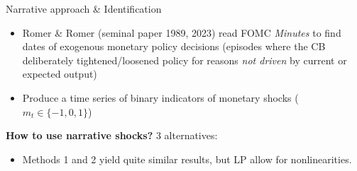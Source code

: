 \documentclass{beamer}
\begin{document}
\begin{frame}{Narrative approach \& Identification}
\small

\begin{itemize}
\item Romer \& Romer (seminal paper 1989, 2023) read FOMC \textit{Minutes} to find dates of exogenous monetary policy decisions (episodes where the CB deliberately tightened/loosened policy for reasons \emph{not driven} by current or expected output)
\item Produce a time series of binary indicators of monetary shocks ($m_t \in \{-1,0,1\}$)
\end{itemize}

\textbf{How to use narrative shocks?} 3 alternatives:
\begin{itemize}
  \begin{enumerate}
  \item \textbf{Include it as an exogenous regressor (VARX) or as the shock in a
        Structural VAR block where the narrative equation is purely exogenous.}
  \item Use \textbf{Local Projection }(\textit{cf. next class}) equation of interest with narrative shock as structural shock and compute IRFs (Jordà, 2015).
  \item If the measurement is noisy: \textbf{use it as an instrument (Proxy-VAR}, cf. \textit{next class})
  \end{enumerate}
\item Methods 1 and 2 yield quite similar results, but LP allow for nonlinearities.
\end{itemize}

\end{frame}
\end{document}

